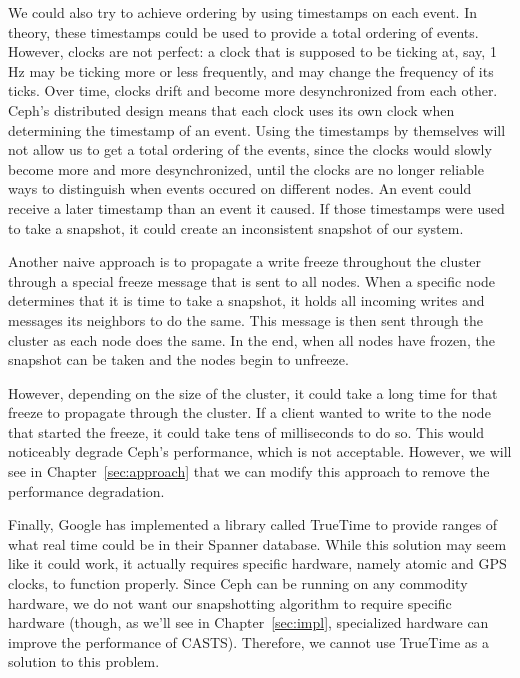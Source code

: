 We could also try to achieve ordering by using timestamps on each event. In theory,
these timestamps could be used to provide a total ordering of events. However,
clocks are not perfect: a clock that is supposed to be ticking at, say, 1 Hz 
may be ticking more or less frequently, and may change the frequency of its 
ticks. Over time, clocks drift and become more
desynchronized from each other. Ceph's distributed design means that
each clock uses its own clock when determining the timestamp of an
event. Using the timestamps by themselves will not allow us to get a
total ordering of the events, since the clocks would slowly become
more and more desynchronized, until the clocks are no longer reliable
ways to distinguish when events occured on different nodes. An event
could receive a later timestamp than an event it caused. If those timestamps 
were used to take a snapshot, it could create an inconsistent snapshot of our 
system.

Another naive approach is to propagate a write freeze throughout the
cluster through a special freeze message that is sent to all nodes.  When a specific node determines that it is time to take a
snapshot, it holds all incoming writes and messages its neighbors to
do the same. This message is then sent through the cluster as each node
does the same. In the end, when all nodes have frozen, the snapshot
can be taken and the nodes begin to unfreeze.

However, depending on the size of the cluster, it could take a long
time for that freeze to propagate through the cluster. If a client
wanted to write to the node that started the freeze, it could take
tens of milliseconds to do so.  This would noticeably degrade Ceph's
performance, which is not acceptable.  However, we will see in
Chapter~\ref{sec:approach} that we can modify this approach to remove
the performance degradation.

Finally, Google has implemented a library called TrueTime to provide
ranges of what real time could be in their Spanner database. While
this solution may seem like it could work, it actually requires
specific hardware, namely atomic and GPS clocks, to function
properly. Since Ceph can be running on any commodity hardware, we do
not want our snapshotting algorithm to require specific hardware (though, as we'll
see in Chapter~\ref{sec:impl}, specialized hardware can improve the
performance of CASTS). Therefore, we cannot use TrueTime as a
solution to this problem. 















